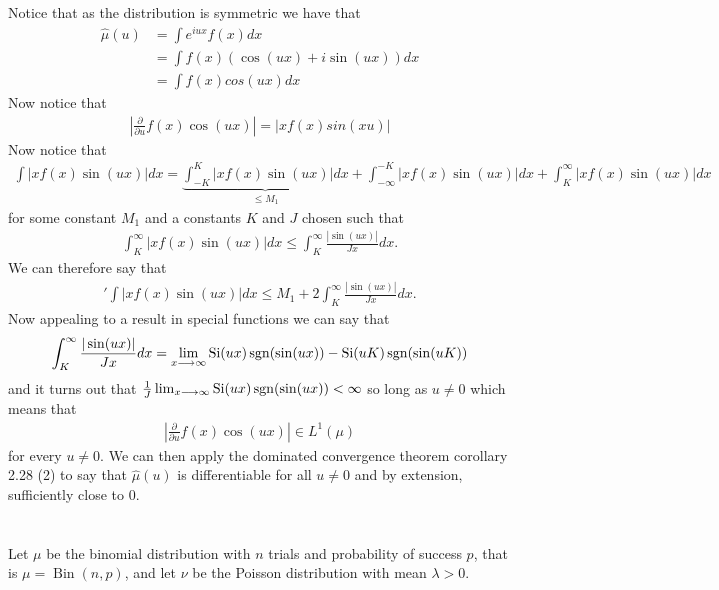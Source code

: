 \documentclass{unswmaths}
\begin{document}
\subsection{}
Notice that as the distribution is symmetric we have that
\begin{align}
	\hat{\mu}(u) &= \int e^{iux} f(x) dx \\
		 &= \int f(x)( \cos(ux) + i\sin(ux)) dx\\
		 &= \int f(x) cos(ux) dx
\end{align}
Now notice that
\begin{align}
	\left|\frac{\partial}{\partial u} f(x) \cos(ux)\right| = |xf(x)sin(xu)|
\end{align}
Now notice that
\begin{align}
	\int |xf(x)\sin(ux)| dx = \underbrace{\int_{-K}^{K} |xf(x)\sin(ux)| dx}_{\leq M_1} + \int_{-\infty}^{-K} |xf(x)\sin(ux)| dx +\int_{K}^{\infty} |xf(x)\sin(ux)| dx
\end{align}
for some constant $ M_1 $ and a constants $ K $ and $ J $ chosen such that
\begin{align}
	\int_{K}^\infty |xf(x)\sin(ux)| dx \leq \int_{K}^\infty \frac{|\sin(ux)|}{Jx} dx.
\end{align}
We can therefore say that
\begin{align}'
	\int |xf(x)\sin(ux)|dx \leq M_1 + 2 \int_K^\infty \frac{|\sin(ux)|}{Jx}dx.
\end{align}
Now appealing to a result in special functions we can say that 
\begin{align}
	\int_K^\infty \frac{|\sin(ux)|}{Jx}dx = \lim_{x \longrightarrow \infty} \operatorname{Si}(ux)\operatorname{sgn}(\sin(ux)) -\operatorname{Si}(uK)\operatorname{sgn}(\sin(uK))
\end{align}
and it turns out that $ \frac{1}{J}\lim_{x\longrightarrow\infty} \operatorname{Si}(ux)\operatorname{sgn}(\sin(ux)) < \infty $ so long as $ u \neq 0 $ which means that 
\begin{align}
	\left|\frac{\partial}{\partial u} f(x) \cos(ux)\right| \in L^1(\mu)
\end{align}
for every $ u \neq 0 $. 
We can then apply the dominated convergence theorem corollary 2.28 (2) to say that $ \hat{\mu}(u) $ is differentiable for all $ u \neq 0 $ and by extension, sufficiently close to $ 0 $.
\section{}
Let $\mu$ be the binomial distribution with $ n $ trials and probability of success $ p $, that is $ \mu = \operatorname{Bin}(n,p) $, and let $ \nu $ be the Poisson distribution with mean $ \lambda > 0 $. 
\end{document}
